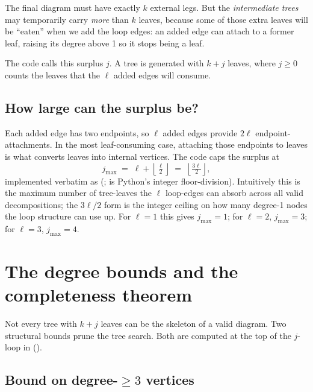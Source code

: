 The final diagram must have exactly $k$ external legs. But the \emph{intermediate
trees} may temporarily carry \emph{more} than $k$ leaves, because some of those
extra leaves will be ``eaten'' when we add the loop edges: an added edge can
attach to a former leaf, raising its degree above 1 so it stops being a leaf.

The code calls this surplus $j$. A tree is generated with $k+j$ leaves, where
$j\ge 0$ counts the leaves that the $\ell$ added edges will consume.

\subsection{How large can the surplus be?}

Each added edge has two endpoints, so $\ell$ added edges provide $2\ell$
endpoint-attachments. In the most leaf-consuming case, attaching those endpoints
to leaves is what converts leaves into internal vertices. The code caps the
surplus at
\begin{equation}
  j_{\max} \;=\; \ell + \left\lfloor \tfrac{\ell}{2} \right\rfloor
  \;=\; \left\lfloor \tfrac{3\ell}{2} \right\rfloor,
  \label{eq:jmax}
\end{equation}
implemented verbatim as 
(; \code{//} is Python's integer
floor-division). Intuitively this is the maximum number of tree-leaves the
$\ell$ loop-edges can absorb across all valid decompositions; the $3\ell/2$ form
is the integer ceiling on how many degree-1 nodes the loop structure can use up.
For $\ell=1$ this gives $j_{\max}=1$; for $\ell=2$, $j_{\max}=3$; for $\ell=3$,
$j_{\max}=4$.

\section{The degree bounds and the completeness theorem}
\label{sec:bounds}

Not every tree with $k+j$ leaves can be the skeleton of a valid \msrjd{} diagram.
Two structural bounds prune the tree search. Both are computed at the top of the
$j$-loop in 
().

\subsection{Bound on degree-\texorpdfstring{$\ge 3$}{>=3} vertices}

